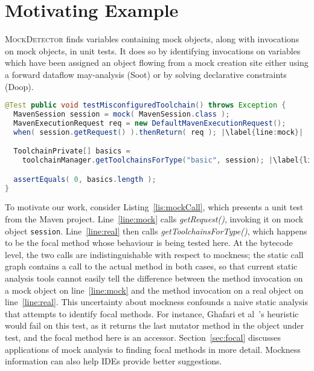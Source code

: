 \section{Motivating Example}
\label{sec:motivating-example}

\textsc{MockDetector} finds variables containing mock objects, along with invocations on mock objects, in unit tests. It does so by identifying invocations on variables which have been assigned an object flowing from a mock creation site either using a forward dataflow may-analysis (Soot) or by solving declarative constraints (Doop).

\begin{lstlisting}[basicstyle=\ttfamily, caption={Code snippet from maven-core, where calls to both the focal method \texttt{getToolchainsForType()} and to mock \texttt{session}'s \texttt{getRequest()} method occur in test \textit{testMisconfiguredToolchain()}.},
basicstyle=\scriptsize\ttfamily,language = Java, framesep=4.5mm, escapechar=|,
framexleftmargin=1.0mm, captionpos=b, label=lis:mockCall, morekeywords={@Test}]
@Test public void testMisconfiguredToolchain() throws Exception {
  MavenSession session = mock( MavenSession.class );
  MavenExecutionRequest req = new DefaultMavenExecutionRequest();
  when( session.getRequest() ).thenReturn( req ); |\label{line:mock}|

  ToolchainPrivate[] basics =
    toolchainManager.getToolchainsForType("basic", session); |\label{line:real}|

  assertEquals( 0, basics.length );
}
\end{lstlisting}

To motivate our work, consider Listing~\ref{lis:mockCall}, which presents a unit test from the Maven project. Line~\ref{line:mock} calls \textit{getRequest()}, invoking it on mock object \texttt{session}. Line~\ref{line:real} then calls \textit{getToolchainsForType()}, which happens to be the focal method whose behaviour is being tested here. At the bytecode level, the two calls are indistinguishable with respect to mockness; the static call graph contains a call to the actual method in both cases, so that current static analysis tools cannot easily tell the difference between the method invocation on a mock object on line~\ref{line:mock} and the method invocation on a real object on line~\ref{line:real}. This uncertainty about mockness confounds a naive static analysis that attempts to identify focal methods. For instance, Ghafari et al~\cite{ghafari15:_autom}'s heuristic would fail on this test, as it returns the last mutator method in the object under test, and the focal method here is an accessor. Section~\ref{sec:focal} discusses applications of mock analysis to finding focal methods in more detail. Mockness information can also help IDEs provide better suggestions. 


